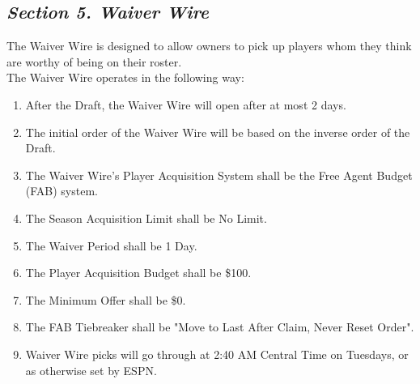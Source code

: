 \documentclass{article}
\begin{document}
    \subsection{\textit{Section 5. Waiver Wire}}
    The Waiver Wire is designed to allow owners to pick up players whom they think are worthy of being on their roster.\\

    \noindent The Waiver Wire operates in the following way:
    \begin{enumerate}[label=\Alph*)]
        \item After the Draft, the Waiver Wire will open after at most 2 days.
        \item The initial order of the Waiver Wire will be based on the inverse order of the Draft.
        \item The Waiver Wire's Player Acquisition System shall be the Free Agent Budget (FAB) system.
        \item The Season Acquisition Limit shall be No Limit.
        \item The Waiver Period shall be 1 Day.
        \item The Player Acquisition Budget shall be \$100.
        \item The Minimum Offer shall be \$0.
        \item The FAB Tiebreaker shall be "Move to Last After Claim, Never Reset Order".
        \item Waiver Wire picks will go through at 2:40 AM Central Time on Tuesdays, or as otherwise set by ESPN.
    \end{enumerate}
\end{document}
